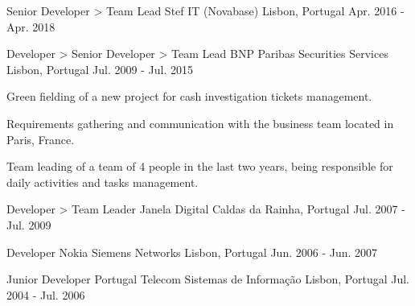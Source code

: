 \begin{cventries}
  \cventry
    {Senior Developer > Team Lead} %
    {Stef IT (Novabase)} %
    {Lisbon, Portugal} %
    {Apr. 2016 - Apr. 2018} %
    {
    }

  \cventry
    {Developer > Senior Developer > Team Lead} %
    {BNP Paribas Securities Services} %
    {Lisbon, Portugal} %
    {Jul. 2009 - Jul. 2015} %
    {
      \begin{cvitems} %
        \item {Green fielding of a new project for cash investigation tickets management.}
        \item {Requirements gathering and communication with the business team located in Paris, France.}
        \item {Team leading of a team of 4 people in the last two years, being responsible for daily activities and tasks management.}
      \end{cvitems}
    }

  \cventry
    {Developer > Team Leader} %
    {Janela Digital} %
    {Caldas da Rainha, Portugal} %
    {Jul. 2007 - Jul. 2009} %
    {
    }

  \cventry
    {Developer} %
    {Nokia Siemens Networks} %
    {Lisbon, Portugal} %
    {Jun. 2006 - Jun. 2007} %
    {
    }

  \cventry
    {Junior Developer} %
    {Portugal Telecom Sistemas de Informação} %
    {Lisbon, Portugal} %
    {Jul. 2004 - Jul. 2006} %
    {
    }

\end{cventries}
